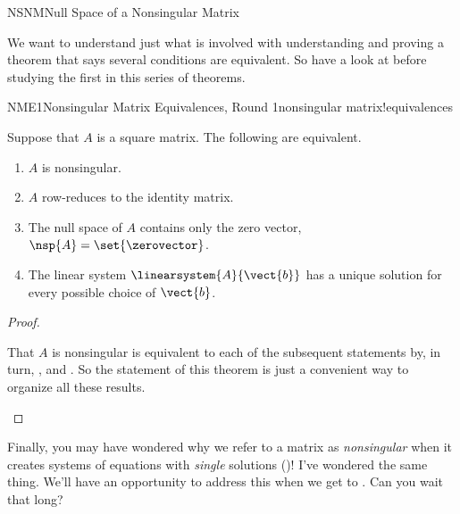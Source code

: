 \begin{subsect}{NSNM}{Null Space of a Nonsingular Matrix}
%
\begin{para}We want to understand just what is involved with understanding and proving a theorem that says several conditions are equivalent. So have a look at  before studying the first in this series of theorems.\end{para}
%
\begin{theorem}{NME1}{Nonsingular Matrix Equivalences, Round 1}{nonsingular matrix!equivalences}
\begin{para}Suppose that $A$ is a square matrix.  The following are equivalent.
%
\begin{enumerate}
\item $A$ is nonsingular.
\item $A$ row-reduces to the identity matrix.
\item The null space of $A$ contains only the zero vector, $\nsp{A}=\set{\zerovector}$.
\item The linear system $\linearsystem{A}{\vect{b}}$ has a unique solution for every possible choice of $\vect{b}$.
\end{enumerate}\end{para}
\end{theorem}
%
\begin{proof}
\begin{para}That $A$ is nonsingular is equivalent to each of the subsequent statements by, in turn,
,
 and
.  So the statement of this theorem is just a convenient way to organize all these results.\end{para}
\end{proof}
%
%
\begin{para}Finally, you may have wondered why we refer to a matrix as {\em nonsingular} when it creates systems of equations with {\em single} solutions ()!  I've wondered the same thing.  We'll have an opportunity to address this when we get to .  Can you wait that long?\end{para}
%
\end{subsect}
%




